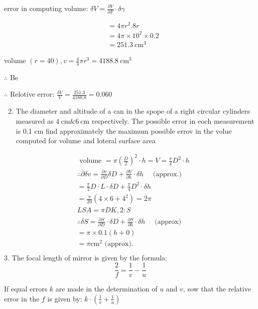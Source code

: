 \documentclass[12pt, a4paper]{article}
\begin{document}
error in computing volume: $\delta V=\frac{\partial V}{\partial F} \cdot \delta \gamma$

$$
\begin{aligned}
& =4 \pi r^{2} .8 r \\
& =4 \pi \times 10^{2} \times 0.2 \\
& =251.3 \mathrm{~cm}^{3}
\end{aligned}
$$

volume $(r=40), v=\frac{4}{3} \pi r^{3}=4188.8 \mathrm{~cm}^{3}$

$\therefore$ Be

$\therefore$ Relotive error: $\frac{\delta V}{V}=\frac{251.3}{4188.8}=0.060$

\begin{enumerate}
  \setcounter{enumi}{1}
  \item The diameter and altitude of a can in the spope of a right circular cylinders measured as $4 \mathrm{~cm} \& 6 \mathrm{~cm}$ respectively. The possible error in eoch measurement is 0.1 cm find approximately the maximum possible errov in the volue computed for volume and loteral surface area
\end{enumerate}

$$
\begin{aligned}
& \text { volume }=\pi\left(\frac{D}{2}\right)^2 \cdot h=V=\frac{\pi}{4} D^2 \cdot h \\
& \therefore \partial \delta v=\frac{\partial v}{\partial D} \delta D+\frac{\partial V}{\partial h} \cdot \delta h \quad \text { (approx.) } \\
& =\frac{\pi}{2} D \cdot L \cdot \delta D+\frac{\pi}{4} D^2 \cdot \delta h \\
& =\frac{\pi}{20}\left(4 \times 6+4^2\right)=2 \pi \\
& L S A=\pi D K, 2: S \\
& \therefore \delta S=\frac{\partial S}{\partial D} \cdot \delta D+\frac{\partial S}{\partial h} \cdot \delta h \quad \text { (approx) } \\
& =\pi \times 0.1(h+0) \\
& =\pi \mathrm{cm}^2 \text { (approx). } \\
&
\end{aligned}
$$
3. The focal length of mirror is given by the formula:
$$
\frac{2}{f}=\frac{1}{v}-\frac{1}{u}
$$

If equal errors $k$ are made in the determination of $u$ and $v$, sow that the relative error in the $f$ is given by: $k \cdot\left(\frac{1}{v}+\frac{1}{u}\right)$
\end{document}

